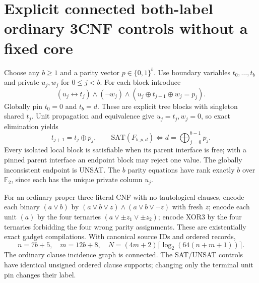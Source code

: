 \documentclass[11pt]{article}
\begin{document}
\section{Explicit connected both-label ordinary 3CNF controls without a fixed core}
Choose any $b\ge1$ and a parity vector $p\in\{0,1\}^b$. Use boundary variables $t_0,\ldots,t_b$ and private $u_j,w_j$ for $0\le j<b$. For each block introduce
\[
(u_j\leftrightarrow t_j)\land(\neg w_j)\land
(u_j\oplus t_{j+1}\oplus w_j=p_j).
\]
Globally pin $t_0=0$ and $t_b=d$. These are explicit tree blocks with singleton shared $t_j$. Unit propagation and equivalence give $u_j=t_j,w_j=0$, so exact elimination yields
\[
t_{j+1}=t_j\oplus p_j,\qquad
\mathrm{SAT}(F_{b,p,d})\iff d=\bigoplus_{j=0}^{b-1}p_j.
\]
Every isolated local block is satisfiable when its parent interface is free; with a pinned parent interface an endpoint block may reject one value. The globally inconsistent endpoint is UNSAT. The $b$ parity equations have rank exactly $b$ over $\mathbb F_2$, since each has the unique private column $u_j$.

For an ordinary proper three-literal CNF with no tautological clauses, encode each binary $(a\lor b)$ by $(a\lor b\lor z)\land(a\lor b\lor\neg z)$ with fresh $z$; encode each unit $(a)$ by the four ternaries $(a\lor\pm z_1\lor\pm z_2)$; encode XOR3 by the four ternaries forbidding the four wrong parity assignments. These are existentially exact gadget compilations. With canonical source IDs and ordered records,
\[
\boxed{n=7b+5,\quad m=12b+8,\quad
N=(4m+2)\lceil\log_2(64(n+m+1))\rceil.}
\]
The ordinary clause incidence graph is connected. The SAT/UNSAT controls have identical unsigned ordered clause supports; changing only the terminal unit pin changes their label.
\end{document}
